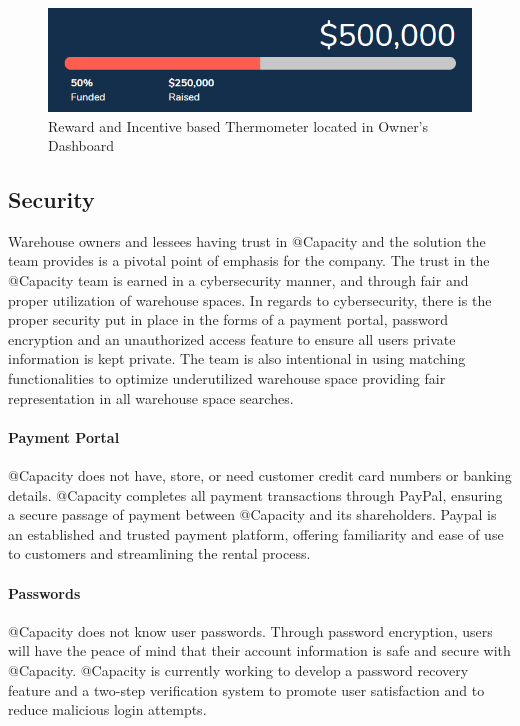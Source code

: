 \begin{figure}[H]
\centering
\includegraphics[width=.75\textwidth]{Phase_3/thermometer}
\caption{Reward and Incentive based Thermometer located in Owner's Dashboard}
\label{fig:thermometer}
\end{figure}

\subsection{Security}
Warehouse owners and lessees having trust in @Capacity and the solution the team provides is a pivotal point of emphasis for the company. The trust in the @Capacity team is earned in a cybersecurity manner, and through fair and proper utilization of warehouse spaces. In regards to cybersecurity, there is the proper security put in place in the forms of a payment portal, password encryption and an unauthorized access feature to ensure all users private information is kept private. The team is also intentional in using matching functionalities to optimize underutilized warehouse space providing fair representation in all warehouse space searches. 

\paragraph{Payment Portal}
@Capacity does not have, store, or need customer credit card numbers or banking details.  @Capacity completes all payment transactions through PayPal, ensuring a secure passage of payment between @Capacity and its shareholders. Paypal is an established and trusted payment platform, offering familiarity and ease of use to customers and streamlining the rental process. 

\paragraph{Passwords}
@Capacity does not know user passwords.  Through password encryption, users will have the peace of mind that their account information is safe and secure with @Capacity.  @Capacity is currently working to develop a password recovery feature and a two-step verification system to promote user satisfaction and to reduce malicious login attempts.

